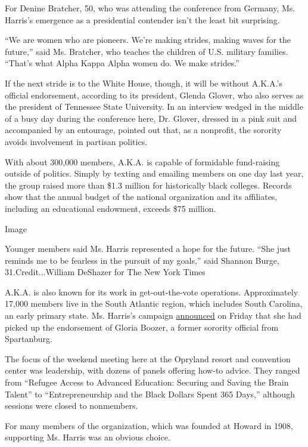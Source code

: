 For Denine Bratcher, 50, who was attending the conference from Germany,
Ms. Harris's emergence as a presidential contender isn't the least bit
surprising.

``We are women who are pioneers. We're making strides, making waves for
the future,'' said Ms. Bratcher, who teaches the children of U.S.
military families. ``That's what Alpha Kappa Alpha women do. We make
strides.''

If the next stride is to the White House, though, it will be without
A.K.A.'s official endorsement, according to its president, Glenda
Glover, who also serves as the president of Tennessee State University.
In an interview wedged in the middle of a busy day during the conference
here, Dr. Glover, dressed in a pink suit and accompanied by an
entourage, pointed out that, as a nonprofit, the sorority avoids
involvement in partisan politics.

With about 300,000 members, A.K.A. is capable of formidable fund-raising
outside of politics. Simply by texting and emailing members on one day
last year, the group raised more than \$1.3 million for historically
black colleges. Records show that the annual budget of the national
organization and its affiliates, including an educational endowment,
exceeds \$75 million.

Image

Younger members said Ms. Harris represented a hope for the future. ``She
just reminds me to be fearless in the pursuit of my goals,'' said
Shannon Burge, 31.Credit...William DeShazer for The New York Times

A.K.A. is also known for its work in get-out-the-vote operations.
Approximately 17,000 members live in the South Atlantic region, which
includes South Carolina, an early primary state. Ms. Harris's campaign
\href{https://blog.4president.org/2020/2019/06/kamala-harris-receives-key-endorsements-from-black-south-carolina-leaders.html}{announced}
on Friday that she had picked up the endorsement of Gloria Boozer, a
former sorority official from Spartanburg.

The focus of the weekend meeting here at the Opryland resort and
convention center was leadership, with dozens of panels offering how-to
advice. They ranged from ``Refugee Access to Advanced Education:
Securing and Saving the Brain Talent'' to ``Entrepreneurship and the
Black Dollars Spent 365 Days,'' although sessions were closed to
nonmembers.

For many members of the organization, which was founded at Howard in
1908, supporting Ms. Harris was an obvious choice.

